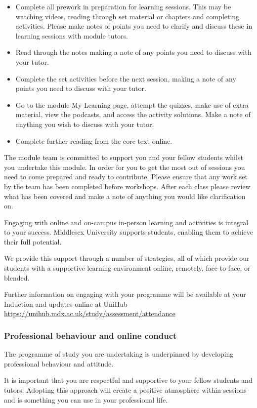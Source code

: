 \documentclass{MDXHandbook}
\begin{document}
\begin{itemize}
	\item Complete all prework in preparation for learning sessions. This may be watching videos, reading through set material or chapters and completing activities. Please make notes of points you need to clarify and discuss these in learning sessions with module tutors. 
	\item Read through the notes making a note of any points you need to discuss with your tutor. 
	\item Complete the set activities before the next session, making a note of any points you need to discuss with your tutor. 
	\item Go to the module My Learning page, attempt the quizzes, make use of extra material, view the podcasts, and access the activity solutions. Make a note of anything you wish to discuss with your tutor. 
	\item Complete further reading from the core text online. 
\end{itemize}
The module team is committed to support you and your fellow students whilst you undertake this module. In order for you to get the most out of sessions you need to come prepared and ready to contribute. Please ensure that any work set by the team has been completed before workshops. After each class please review what has been covered and make a note of anything you would like clarification on.  

Engaging with online and on-campus in-person learning and activities is integral to your success.  Middlesex University supports students, enabling them to achieve their full potential.  

We provide this support through a number of strategies, all of which provide our students with a supportive learning environment online, remotely, face-to-face, or blended. 

Further information on engaging with your programme will be available at your Induction and updates online at UniHub 
\url{https://unihub.mdx.ac.uk/study/assessment/attendance}

\subsubsection*{Professional behaviour and online conduct}
The programme of study you are undertaking is underpinned by developing professional behaviour and attitude.  

It is important that you are respectful and supportive to your fellow students and tutors. Adopting this approach will create a positive atmosphere within sessions and is something you can use in your professional life.  
\end{document}
